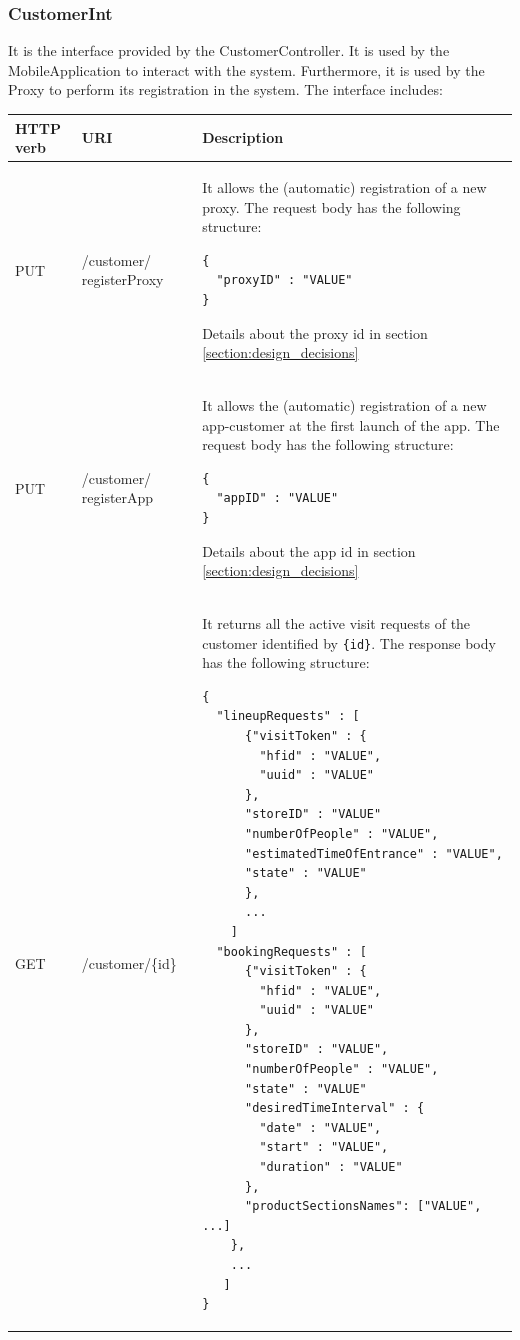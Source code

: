 \documentclass[a4paper,oneside,11pt]{book}
\begin{document}
    \subsubsection{CustomerInt}
    It is the interface provided by the CustomerController. It is used by the MobileApplication to interact with the system. Furthermore, it is used by the Proxy to perform its registration in the system. The interface includes:
    \begin{longtable}[c] { |>{\centering\arraybackslash}P{0.11\textwidth}|>{\centering\arraybackslash\ttfamily}H{0.23\textwidth}|H{0.50\textwidth}| }
        \hline
        \textbf{HTTP verb} & \textrm{\textbf{URI}} & \textbf{\textbf{Description}} \\ \hline
        PUT & /customer/ registerProxy & It allows the (automatic) registration of a new proxy. The request body has the following structure: 
        \begin{lstlisting}[language=jsonDD]
{
  "proxyID" : "VALUE"
}
        \end{lstlisting} Details about the proxy id in section \ref{section:design_decisions} \\ \hline
        PUT & /customer/ registerApp & It allows the (automatic) registration of a new app-customer at the first launch of the app. The request body has the following structure:
        \begin{lstlisting}[language=jsonDD]
{
  "appID" : "VALUE"
}
        \end{lstlisting} Details about the app id in section \ref{section:design_decisions} \\ \hline
        GET & /customer/\{id\} & It returns all the active visit requests of the customer identified by \texttt{\{id\}}. The response body has the following structure:
        \begin{lstlisting}[language=jsonDD]
{
  "lineupRequests" : [
      {"visitToken" : {
        "hfid" : "VALUE",
        "uuid" : "VALUE"
      },
      "storeID" : "VALUE"
      "numberOfPeople" : "VALUE",
      "estimatedTimeOfEntrance" : "VALUE",
      "state" : "VALUE"
      },
      ...
    ]
  "bookingRequests" : [
      {"visitToken" : {
        "hfid" : "VALUE",
        "uuid" : "VALUE"
      },
      "storeID" : "VALUE",
      "numberOfPeople" : "VALUE",
      "state" : "VALUE"
      "desiredTimeInterval" : {
        "date" : "VALUE",
        "start" : "VALUE",
        "duration" : "VALUE"
      },
      "productSectionsNames": ["VALUE", ...]
    },
    ...
   ]
}
        \end{lstlisting} \\ \hline

\end{longtable}
\end{document}
